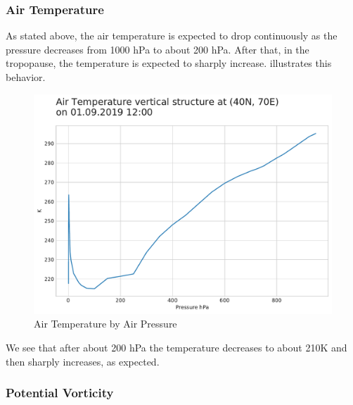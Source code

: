 \documentclass[../00_main.tex]{subfiles}
\begin{document}
\subsubsection{Air Temperature}

As stated above, the air temperature is expected to drop continuously as the
pressure decreases from 1000 hPa to about 200 hPa. After that, in the
tropopause, the temperature is expected to sharply increase. 
illustrates this behavior.
\begin{figure}[H]
\center
    \includegraphics[width=\textwidth]{../graphics/temperature}
    \vspace{-20pt}
    \caption{Air Temperature by Air Pressure}
    \label{temp}
\end{figure}
We see that after about 200 hPa the temperature decreases to about 210K and
then sharply increases, as expected.

\subsubsection{Potential Vorticity}
\end{document}
